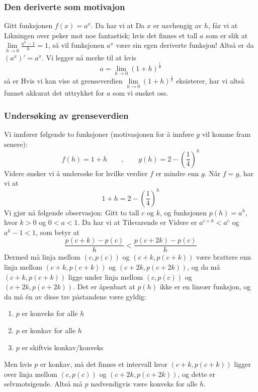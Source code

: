 



	
 \label{eulerstallfork}
\subsubsection{Den deriverte som motivajon}
Gitt funksjonen $ f(x)=a^x $. Da har vi at
Da $ x $ er uavhengig av $ h $, får vi at
Likningen over peker mot noe fantastisk; hvis det finnes et tall $ a $ som er slik at $ {\lim\limits_{h\to 0}\frac{a^h-1}{h}=1} $, så vil funksjonen $ a^x $ være sin egen deriverte funksjon! Altså er da $ \left(a^x\right)'=a^x $. Vi legger nå merke til at hvis
\[ a=\lim\limits_{h\to 0}\left(1+h\right)^\frac{1}{h} \]
så er 
Hvis vi kan vise at grenseverdien $ \lim\limits_{h\to 0}\left(1+h\right)^\frac{1}{h} $ eksisterer, har vi altså funnet akkurat det uttrykket for $ a $ som vi ønsket oss.

\subsubsection{Undersøking av grenseverdien}
Vi innfører følgende to funksjoner (motivasjonen for å innføre $ g $ vil komme fram senere):
\[ f(h)=1+h \qquad,\qquad g(h)=2-\left(\frac{1}{4}\right)^{h}\]
Videre ønsker vi å undersøke for hvilke verdier $ f $ er mindre enn  $ g $. Når $ f=g $, har vi at
\begin{equation}\label{eforkleqh}
	1+h=2-\left(\frac{1}{4}\right)^h 
\end{equation}
Vi gjør nå følgende observasjon: Gitt to tall $ c $ og $ k $, og funksjonen $ p(h)=a^h $, hvor $ k>0 $ og $ 0<a<1 $. Da har vi at
Tilsvarende er
Videre er $ a^{c+k}<a^c $ og $ a^k-1<1 $, som betyr at
\[ \frac{p(c+k)-p(c)}{h}<\frac{p(c+2k)-p(c)}{h} \]
Dermed må linja mellom $ (c, p(c)) $ og $ (c+k, p(c+k)) $ være brattere enn linja mellom $ (c+k, p(c+k)) $ og $ (c+2k, p(c+2k)) $, og da må $ (c+k, p(c+k)) $ ligge under linja mellom $ (c, p(c)) $ og $ (c+2k, p(c+2k)) $.
Det er åpenbart at $ p(h) $ ikke er en lineær funksjon, og da må én av disse tre påstandene være gyldig:
\begin{enumerate}[label=(\alph*)]
	\item $ p $ er konveks for alle $ h$
	\item $ p $ er konkav for alle $ h $
	\item $ p $ er skiftvis konkav/konveks
\end{enumerate}
Men hvis $ p $ er konkav, må det finnes et intervall hvor $ (c+k, p(c+k)) $ ligger over linja mellom $ (c, p(c)) $ og $ (c+2k, p(c+2k)) $, og dette er selvmotsigende. Altså må $ p $ nødvendigvis være konveks for alle $ h $.\vsk

